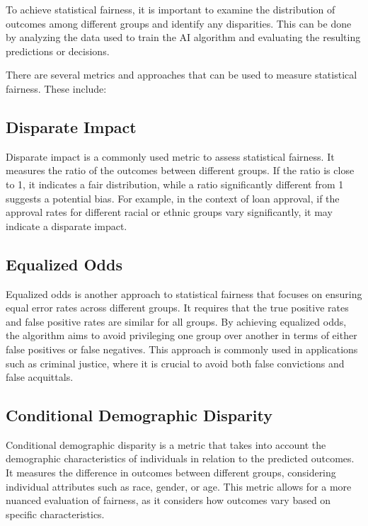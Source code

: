 \documentclass[12pt,a4paper,openright,twoside]{book}
\begin{document}
To achieve statistical fairness, it is important to examine the distribution of outcomes among different groups and identify any disparities. This can be done by analyzing the data used to train the AI algorithm and evaluating the resulting predictions or decisions.

There are several metrics and approaches that can be used to measure statistical fairness. These include:

\subsection{Disparate Impact}

Disparate impact is a commonly used metric to assess statistical fairness. It measures the ratio of the outcomes between different groups. If the ratio is close to 1, it indicates a fair distribution, while a ratio significantly different from 1 suggests a potential bias. For example, in the context of loan approval, if the approval rates for different racial or ethnic groups vary significantly, it may indicate a disparate impact.

\subsection{Equalized Odds}

Equalized odds is another approach to statistical fairness that focuses on ensuring equal error rates across different groups. It requires that the true positive rates and false positive rates are similar for all groups. By achieving equalized odds, the algorithm aims to avoid privileging one group over another in terms of either false positives or false negatives. This approach is commonly used in applications such as criminal justice, where it is crucial to avoid both false convictions and false acquittals.

\subsection{Conditional Demographic Disparity}

Conditional demographic disparity is a metric that takes into account the demographic characteristics of individuals in relation to the predicted outcomes. It measures the difference in outcomes between different groups, considering individual attributes such as race, gender, or age. This metric allows for a more nuanced evaluation of fairness, as it considers how outcomes vary based on specific characteristics.
\end{document}
